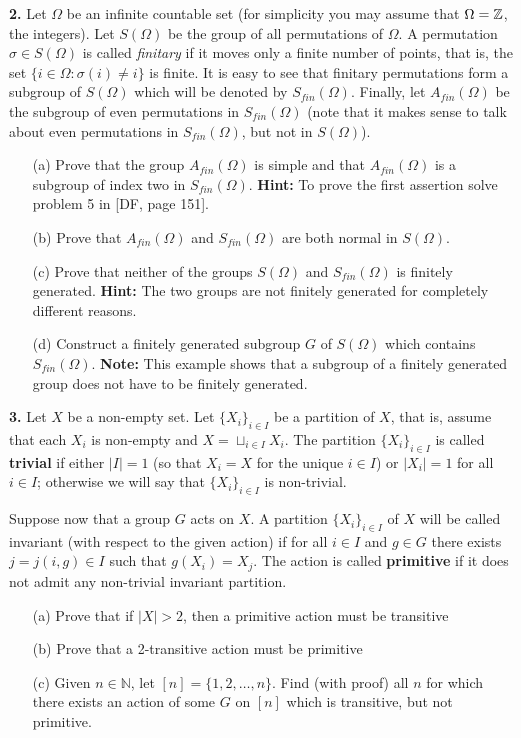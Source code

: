 \documentclass[12pt]{amsart}
\begin{document}
{\bf 2.} Let $\Omega$ be an infinite countable set (for simplicity you may assume that $\Omega={\mathbb Z}$,
the integers). Let $S(\Omega)$ be the group of all permutations of $\Omega$.
A permutation $\sigma\in S(\Omega)$ is called {\it finitary} if it moves
only a finite number of points, that is, the set $\{i\in\Omega : \sigma(i)\neq i\}$
is finite. It is easy to see that finitary permutations form a subgroup of $S(\Omega)$
which will be denoted by $S_{fin}(\Omega)$. Finally, let $A_{fin}(\Omega)$ be the subgroup
of even permutations in $S_{fin}(\Omega)$ (note that it makes sense to talk about
even permutations in $S_{fin}(\Omega)$, but not in $S(\Omega)$).
\begin{itemize}
\item[(a)] Prove that the group $A_{fin}(\Omega)$ is simple and that $A_{fin}(\Omega)$
is a subgroup of index two in $S_{fin}(\Omega)$. {\bf Hint:} To prove the first
assertion solve problem 5 in [DF, page 151]. 
\item[(b)] Prove that $A_{fin}(\Omega)$ and $S_{fin}(\Omega)$ are both normal in $S(\Omega)$.
\item[(c)] Prove that neither of the groups $S(\Omega)$ and $S_{fin}(\Omega)$ is finitely generated. {\bf Hint:} The two groups are not finitely generated for completely
different reasons.
\item[(d)] Construct a finitely generated subgroup $G$ of $S(\Omega)$ which contains
$S_{fin}(\Omega)$. {\bf Note:} This example shows that a subgroup of a finitely
generated group does not have to be finitely generated.
\end{itemize}
\newpage

{\bf 3.} Let $X$ be a non-empty set. Let $\{X_i\}_{i\in I}$ be a partition of $X$, that is, assume that each $X_i$ is non-empty and $X=\sqcup_{i\in I} X_i$. The partition $\{X_i\}_{i\in I}$ is called {\bf trivial} if either $|I|=1$ (so that $X_i=X$ for the unique $i\in I$)
or $|X_i|=1$ for all $i\in I$; otherwise we will say that $\{X_i\}_{i\in I}$ is non-trivial.

Suppose now that a group $G$ acts on $X$. A partition $\{X_i\}_{i\in I}$ of $X$ will be called invariant (with respect to the given action) if for all $i\in I$ and $g\in G$ there exists $j=j(i,g)\in I$ such that $g(X_i)=X_j$. The action is called {\bf primitive} if it does not admit any non-trivial invariant partition.
\begin{itemize}
\item[(a)] Prove that if $|X|> 2$, then a primitive action must be transitive
\item[(b)] Prove that a 2-transitive action must be primitive
\item[(c)] Given $n\in\mathbb N$, let $[n]=\{1,2,\ldots, n\}$. Find (with proof) all $n$ for which there exists an action of some $G$ on $[n]$
which is transitive, but not primitive.
\end{itemize}
\skv
\end{document}
